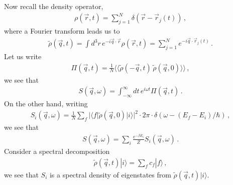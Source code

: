 \documentclass[11pt, oneside]{book}
\theoremstyle{break}
\theoremstyle{break}
\newcommand{\that}[1]{\widetilde{#1}}
\begin{document}
Now recall the density operator, 
\begin{align*}
\rho(\vec{r},t ) = \sum_{j=1}^N \delta (\vec{r} - \vec{r}_j(t))\,,
\end{align*}
where a Fourier transform leads us to 
\begin{align*}
\that{\rho}(\vec{q},t) = \int d^3r \, e^{-i\vec{q}\cdot \vec{r}} \rho(\vec{r},t)  = \sum_{j=1}^N e^{-i\vec{q}\cdot \vec{r}_j(t)}\,.
\end{align*}
Let us write
\begin{align*}
\Pi(\vec{q},t) = \frac{1}{N}\langle\langle 
\that{\rho}(-\vec{q}, t) \, \that{\rho}(\vec{q},0)
\rangle\rangle\,,
\end{align*}
we see that 
\begin{align*}
S(\vec{q},\omega) = \int_{-\infty}^\infty dt\, e^{i\omega t}\Pi(\vec{q},t)\,.
\end{align*}
On the other hand, writing
\begin{align*}
S_i(\vec{q},\omega) = \frac{1}{N}\sum_f |\langle f |\that{\rho}(\vec{q},0)| i\rangle |^2\cdot 2\pi \cdot \delta(\omega - (E_f - E_i)/\hbar)\,,
\end{align*}
we see that 
\begin{align*}
S(\vec{q},\omega) =\sum_i \frac{e^{-\beta E_i}}{Z}S_i(\vec{q},\omega) \,.
\end{align*}
Consider a spectral decomposition 
\begin{align*}
\that{\rho}(\vec{q}, t) |i\rangle = \sum_f c_f|f\rangle\,,
\end{align*}
we see that $S_i$ is a spectral density of eigenstates from $\that{\rho}(\vec{q}, t) |i\rangle $. \\
\end{document}
